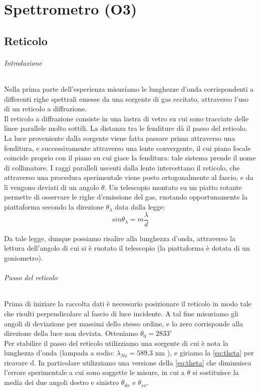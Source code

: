 \chapter{ Spettrometro (O3)}


\section*{Reticolo}

\subparagraph{Introduzione}

Nella prima parte dell'esperienza misuriamo le lunghezze d'onda corrispondenti a differenti righe spettrali emesse da una sorgente di gas eccitato, attraverso l'uso di un reticolo a diffrazione. \\
Il reticolo a diffrazione consiste in una lastra di vetro su cui sono tracciate delle linee parallele molto sottili. La distanza tra le fenditure dà il passo del reticolo.\\
La luce proveniente dalla sorgente viene fatta passare prima attraverso una fenditura, e successivamente attraverso una lente convergente, il cui piano focale coincide proprio con il piano su cui giace la fenditura: tale sistema prende il nome di collimatore. I raggi paralleli uscenti dalla lente intercettano il reticolo, che attraverso una procedura sperimentale viene posto ortogonalmente al fascio, e da lì vengono deviati di un angolo $\theta$. Un telescopio montato su un piatto rotante permette di osservare le righe d'emissione del gas, ruotando opportunamente la piattaforma secondo la direzione $\theta_{\lambda} $ data dalla legge:
\begin{equation}
sin \theta_{\lambda} = m \frac{\lambda}{d}
\label{eq:theta}
\end{equation}


Da tale legge, dunque possiamo risalire alla lunghezza d'onda, attraverso la lettura dell'angolo di cui si è ruotato il telescopio (la piattaforma è dotata di un goniometro).

\subparagraph{Passo del reticolo}

Prima di iniziare la raccolta dati è necessario posizionare il reticolo in modo tale che risulti perpendicolare al fascio di luce incidente. A tal fine misuriamo gli angoli di deviazione per massimi dello stesso ordine, e lo zero corrisponde alla direzione della luce non deviata. Otteniamo $\theta_{0} = 283 3' $ \\
Per stabilire il passo del reticolo utilizziamo una sorgente di cui è nota la lunghezza d'onda (lampada a sodio: $\lambda_{Na} = 589.3 $ nm ), e giriamo la \ref{eq:theta} per ricavare d. In particolare utilizziamo una versione della \ref{eq:theta} che diminuisca l'errore sperimentale a cui sono soggette le misure, in cui a $\theta$ si sostituisce la media dei due angoli destro e sinistro $\theta_{dx} $ e $\theta_{sx}$.

